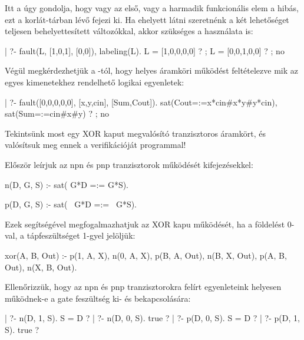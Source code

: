 Itt a  úgy gondolja, hogy vagy az első, vagy a harmadik funkcionális
elem a hibás, ezt a korlát-tárban lévő  fejezi ki. Ha
ehelyett látni szeretnénk a két lehetőséget teljesen behelyettesített
változókkal, akkor szükséges a  használata is:

\begin{prologcode}
| ?- fault(L, [1,0,1], [0,0]), labeling(L).
                            L = [1,0,0,0,0] ? ;
                            L = [0,0,1,0,0] ? ; no
\end{prologcode}

Végül megkérdezhetjük a -tól, hogy helyes áramköri működést
feltételezve mik az egyes kimenetekhez rendelhető logikai egyenletek:

\begin{prologcode}
| ?- fault([0,0,0,0,0], [x,y,cin], [Sum,Cout]).
                            sat(Cout=:=x*cin#x*y#y*cin),
                            sat(Sum=:=cin#x#y) ? ; no
\end{prologcode}

Tekintsünk most egy XOR kaput megvalósító tranzisztoros áramkört, és
valósítsuk meg ennek a verifikációját \clpb programmal!

\begin{center}\end{center}

Először leírjuk az npn és pnp tranzisztorok működését \clpb kifejezésekkel:
\begin{prologcode}
n(D, G, S) :-    %
        sat( G*D =:= G*S).

p(D, G, S) :-    %
        sat( ~G*D =:= ~G*S).
\end{prologcode}

Ezek segítségével megfogalmazhatjuk az XOR kapu működését, ha a földelést
0-val, a tápfeszültséget 1-gyel jelöljük:

\begin{prologcode}
xor(A, B, Out) :-
        p(1, A, X),
        n(0, A, X),
        p(B, A, Out),
        n(B, X, Out),
        p(A, B, Out),
        n(X, B, Out).
\end{prologcode}

Ellenőrizzük, hogy az npn és pnp tranzisztorokra felírt egyenleteink
helyesen működnek-e a gate feszültség ki- és bekapcsolására:

\begin{prologcode}
| ?- n(D, 1, S).                 S = D ?
| ?- n(D, 0, S).                 true ?
| ?- p(D, 0, S).                 S = D ?
| ?- p(D, 1, S).                 true ?
\end{prologcode}

